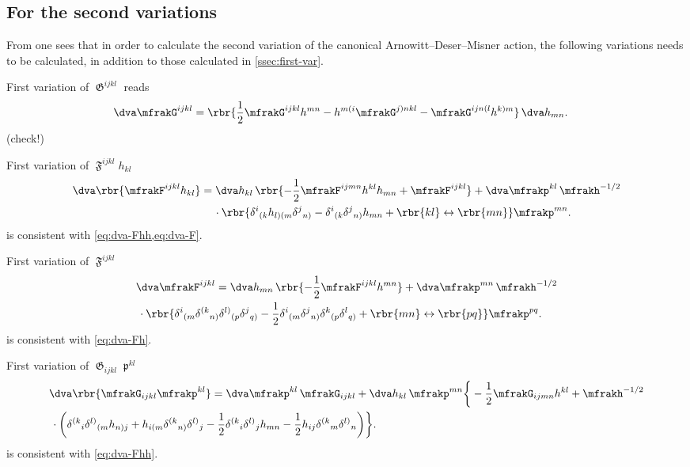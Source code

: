 \documentclass[a4paper,11pt]{article}
\begin{document}
\subsection{For the second variations}
\label{ssec:second-var}

From  one sees that in 
order to calculate the second variation of the canonical 
Arnowitt--Deser--Misner action, the following variations needs to be 
calculated, in addition to those calculated in \cref{ssec:first-var}.

First variation of $\mfrakG^{ijkl}$ reads
\begin{align}
\dva \mfrakG^{ijkl} &= \rbr{\frac{1}{2}\mfrakG^{ijkl} h^{mn}
-h^{m(i} \mfrakG^{j)nkl} - \mfrakG^{ijn(l} h^{k)m}} \,\dva h_{mn}.
\end{align}
(check!)

First variation of $\mfrakF^{ijkl}h_{kl}$
\begin{align}
\dva\rbr{\mfrakF^{ijkl}h_{kl}} &= \dva h_{kl}\,
\rbr{-\frac{1}{2}\mfrakF^{ijmn}h^{kl}h_{mn}+\mfrakF^{ijkl}}
+
\dva \mfrakp^{kl} \, \mfrakh^{-1/2}
\nonumber \\
&\quad\,\cdot
\rbr{\delta^{i}{}_{(k}h_{l)(m}\delta^{j}{}_{n)}-
\delta^{i}{}_{(k}\delta^{j}{}_{n)}h_{mn} 
+ \rbr{kl}\leftrightarrow\rbr{mn}}
\mfrakp^{mn}.
\label{eq:dva-Fh}
\end{align}
 is consistent with \cref{eq:dva-Fhh,eq:dva-F}.

First variation of $\mfrakF^{ijkl}$
\begin{align}
&\dva\mfrakF^{ijkl} = \dva h_{mn}\,\rbr{-\frac{1}{2}\mfrakF^{ijkl}h^{mn}}
+\dva\mfrakp^{mn}\,\mfrakh^{-1/2}
\nonumber \\
&\,\cdot \rbr{
\delta^{i}{}_{(m} \delta^{(k}{}_{n)} \delta^{l)}{}_{(p} \delta^{j}{}_{q)} -
\frac{1}{2}
\delta^{i}{}_{(m} \delta^{j}{}_{n)} \delta^{k}{}_{(p} \delta^{l}{}_{q)}
+\rbr{mn}\leftrightarrow\rbr{pq}}\mfrakp^{pq}.
\label{eq:dva-F}
\end{align}
 is consistent with \cref{eq:dva-Fh}.

First variation of $\mfrakG_{ijkl}\mfrakp^{kl}$
\begin{align}
&\dva\rbr{\mfrakG_{ijkl}\mfrakp^{kl}} =
\dva\mfrakp^{kl}\,\mfrakG_{ijkl}+\dva h_{kl}\,\mfrakp^{mn}
\bigg\{-\frac{1}{2}\mfrakG_{ijmn}h^{kl} + \mfrakh^{-1/2}
\nonumber \\
&\,\cdot\bigg(
\delta^{(k}{}_{i} \delta^{l)}{}_{(m} h_{n)j} +
h_{i(m} \delta^{(k}{}_{n)} \delta^{l)}{}_{j} - \frac{1}{2}
\delta^{(k}{}_{i} \delta^{l)}{}_{j} h_{mn} - \frac{1}{2}
h_{ij} \delta^{(k}{}_{m} \delta^{l)}{}_{n} \bigg)\bigg\}.
\label{eq:dva-Gp}
\end{align}
 is consistent with \cref{eq:dva-Fhh}.
\end{document}
